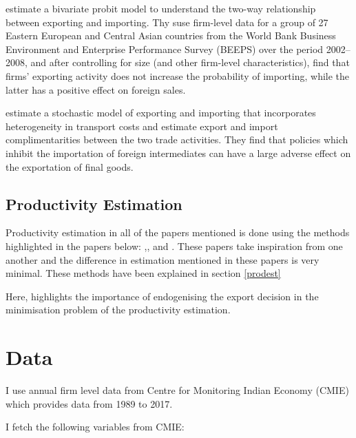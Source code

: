 \documentclass[11pt]{article}
\begin{document}
\cite{aristei2013firms} estimate a bivariate probit model to
understand the two-way relationship between exporting and importing. 
Thy suse  firm-level data for a group of 27 Eastern European and 
Central Asian countries from the World Bank Business Environment 
and Enterprise Performance Survey (BEEPS) over the period 2002–2008, 
and after controlling for size (and other firm-level characteristics),
find that firms’ exporting activity does not increase the
probability of importing, while the latter has a positive effect
 on foreign sales. 

\cite{kasahara2013productivity} estimate a stochastic model of
exporting and importing that incorporates heterogeneity in transport
costs and estimate export and import complimentarities between the two
trade activities. They find that policies which inhibit the
importation of  foreign intermediates can have a large adverse 
effect on the exportation of final goods.  

\subsection{Productivity Estimation}
Productivity estimation in all of the papers mentioned is done using
the methods highlighted in the papers below:
\cite{olley1992dynamics},\cite{levinsohn2003estimating},
\cite{ackerberg2006structural} and \cite{wooldridge2009estimating}. 
These papers take inspiration from one another and the difference in
estimation mentioned in these papers is very minimal. These methods
have been explained in section \ref{prodest}

Here, \cite{de2013detecting} highlights the importance of endogenising
the export decision in the minimisation problem of the productivity
estimation. 

\section{Data}\label{sec:data}
I use annual firm level data from Centre for Monitoring Indian Economy
(CMIE) which provides  data from 1989 to 2017. 

I fetch the following variables from CMIE: 

\begin{center}

\end{center}
\end{document}
